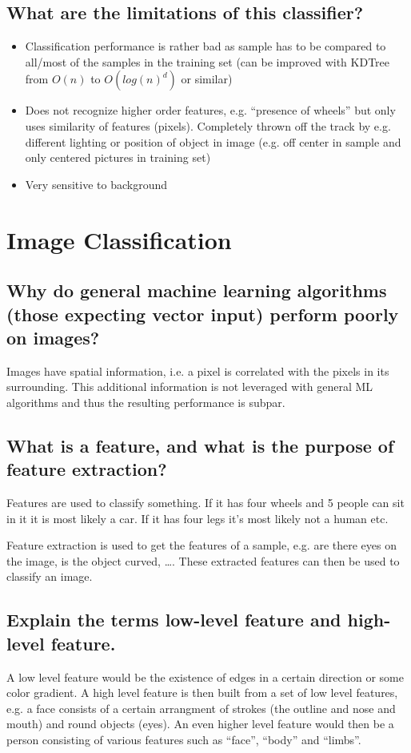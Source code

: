 \subsection{What are the limitations of this classifier?}
\begin{itemize}
\item Classification performance is rather bad as sample has to be compared to all/most of the samples in the training set (can be improved with KDTree from $O(n)$ to $O(log(n)^d)$ or similar)
\item Does not recognize higher order features, e.g. ``presence of wheels'' but only uses similarity of features (pixels). Completely thrown off the track by e.g. different lighting or position of object in image (e.g. off center in sample and only centered pictures in training set)
\item Very sensitive to background
\end{itemize}
%
\section{Image Classification}
\subsection{Why do general machine learning algorithms (those expecting vector input) perform poorly on images?}
Images have spatial information, i.e. a pixel is correlated with the pixels in its surrounding. This additional information is not leveraged with general ML algorithms and thus the resulting performance is subpar.
\subsection{What is a feature, and what is the purpose of feature extraction?}
Features are used to classify something. If it has four wheels and 5 people can sit in it it is most likely a car. If it has four legs it's most likely not a human etc.

Feature extraction is used to get the features of a sample, e.g. are there eyes on the image, is the object curved, \ldots. These extracted features can then be used to classify an image.
\subsection{Explain the terms low-level feature and high-level feature.}
A low level feature would be the existence of edges in a certain direction or some color gradient. A high level feature is then built from a set of low level features, e.g. a face consists of a certain arrangment of strokes (the outline and nose and mouth) and round objects (eyes). An even higher level feature would then be a person consisting of various features such as ``face'', ``body'' and ``limbs''. 
%
